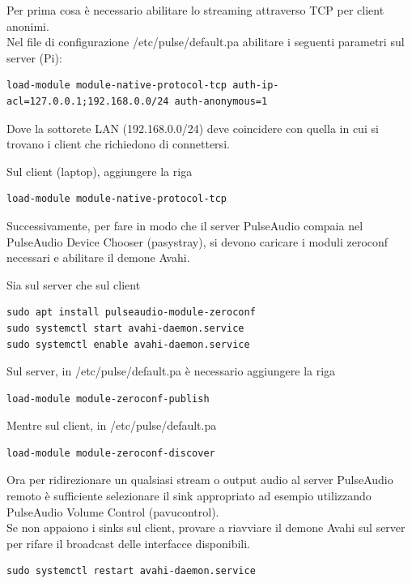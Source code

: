 Per prima cosa è necessario abilitare lo streaming attraverso TCP per client anonimi.\\

\noindent Nel file di configurazione /etc/pulse/default.pa abilitare i seguenti parametri sul server (Pi):
\begin{lstlisting}
load-module module-native-protocol-tcp auth-ip-acl=127.0.0.1;192.168.0.0/24 auth-anonymous=1
\end{lstlisting}

Dove la sottorete LAN (192.168.0.0/24) deve coincidere con quella in cui si trovano i client che richiedono di connettersi.

\noindent Sul client (laptop), aggiungere la riga
\begin{lstlisting}
load-module module-native-protocol-tcp
\end{lstlisting}

Successivamente, per fare in modo che il server PulseAudio compaia nel PulseAudio Device Chooser (pasystray), si devono caricare i moduli zeroconf necessari e abilitare il demone Avahi.

\noindent Sia sul server che sul client
\begin{lstlisting}
sudo apt install pulseaudio-module-zeroconf
sudo systemctl start avahi-daemon.service
sudo systemctl enable avahi-daemon.service
\end{lstlisting}


\noindent Sul server, in /etc/pulse/default.pa è necessario aggiungere la riga
\begin{lstlisting}
load-module module-zeroconf-publish
\end{lstlisting}


\noindent Mentre sul client, in /etc/pulse/default.pa
\begin{lstlisting}
load-module module-zeroconf-discover
\end{lstlisting}

Ora per ridirezionare un qualsiasi stream o output audio al server PulseAudio remoto è sufficiente selezionare il sink appropriato ad esempio utilizzando PulseAudio Volume Control (pavucontrol).\\
Se non appaiono i sinks sul client, provare a riavviare il demone Avahi sul server per rifare il broadcast delle interfacce disponibili.
\begin{lstlisting}
sudo systemctl restart avahi-daemon.service
\end{lstlisting}

